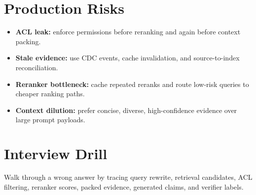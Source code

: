 \section*{Production Risks}
\begin{itemize}
  \item \textbf{ACL leak:} enforce permissions before reranking and again before context packing.
  \item \textbf{Stale evidence:} use CDC events, cache invalidation, and source-to-index reconciliation.
  \item \textbf{Reranker bottleneck:} cache repeated reranks and route low-risk queries to cheaper ranking paths.
  \item \textbf{Context dilution:} prefer concise, diverse, high-confidence evidence over large prompt payloads.
\end{itemize}

\section*{Interview Drill}
Walk through a wrong answer by tracing query rewrite, retrieval candidates, ACL filtering, reranker scores, packed evidence, generated claims, and verifier labels.

